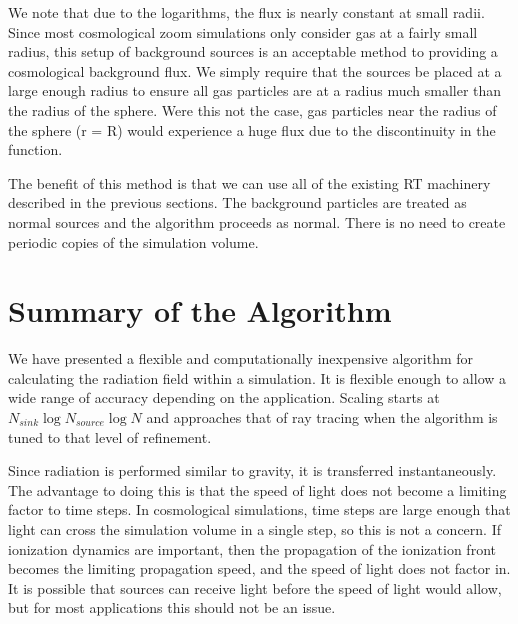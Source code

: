We note that due to the logarithms, the flux is nearly constant at small radii. Since most cosmological zoom simulations only consider gas at a fairly small radius, this setup of background sources is an acceptable method to providing a cosmological background flux. We simply require that the sources be placed at a large enough radius to ensure all gas particles are at a radius much smaller than the radius of the sphere. Were this not the case, gas particles near the radius of the sphere (r = R) would experience a huge flux due to the discontinuity in the function.

The benefit of this method is that we can use all of the existing RT machinery described in the previous sections. The background particles are treated as normal sources and the algorithm proceeds as normal. There is no need to create periodic copies of the simulation volume.

%
%
%
%

\section{Summary of the Algorithm}
\label{sec:algorithmsummary}

We have presented a flexible and computationally inexpensive algorithm for calculating the radiation field within a simulation. It is flexible enough to allow a wide range of accuracy depending on the application. Scaling starts at  $N_{sink}\log{N_{source}}\log{N}$ and approaches that of ray tracing when the algorithm is tuned to that level of refinement.

Since radiation is performed similar to gravity, it is transferred instantaneously. The advantage to doing this is that the speed of light does not become a limiting factor to time steps. In cosmological simulations, time steps are large enough that light can cross the simulation volume in a single step, so this is not a concern. If ionization dynamics are important, then the propagation of the ionization front becomes the limiting propagation speed, and the speed of light does not factor in. It is possible that sources can receive light before the speed of light would allow, but for most applications this should not be an issue.

